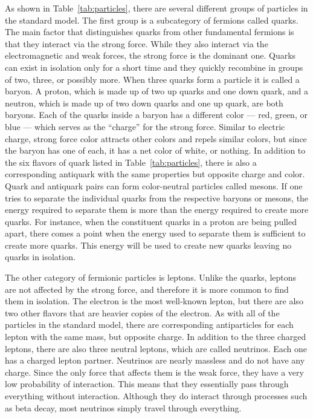 As shown in Table~\ref{tab:particles}, there are several different groups of particles in the standard model. The first group is a subcategory of fermions called quarks. The main factor that distinguishes quarks from other fundamental fermions is that they interact via the strong force. While they also interact via the electromagnetic and weak forces, the strong force is the dominant one. Quarks can exist in isolation only for a short time and they quickly recombine in groups of two, three, or possibly more. When three quarks form a particle it is called a baryon. A proton, which is made up of two up quarks and one down quark, and a neutron, which is made up of two down quarks and one up quark, are both baryons. Each of the quarks inside a baryon has a different color --- red, green, or blue --- which serves as the ``charge'' for the strong force. Similar to electric charge, strong force color attracts other colors and repels similar colors, but since the baryon has one of each, it has a net color of white, or nothing. In addition to the six flavors of quark listed in Table~\ref{tab:particles}, there is also a corresponding antiquark with the same properties but opposite charge and color. Quark and antiquark pairs can form color-neutral particles called mesons. If one tries to separate the individual quarks from the respective baryons or mesons, the energy required to separate them is more than the energy required to create more quarks. For instance, when the constituent quarks in a proton are being pulled apart, there comes a point when the energy used to separate them is sufficient to create more quarks. This energy will be used to create new quarks leaving no quarks in isolation.

The other category of fermionic particles is leptons. Unlike the quarks, leptons are not affected by the strong force, and therefore it is more common to find them in isolation. The electron is the most well-known lepton, but there are also two other flavors that are heavier copies of the electron. As with all of the particles in the standard model, there are corresponding antiparticles for each lepton with the same mass, but opposite charge. In addition to the three charged leptons, there are also three neutral leptons, which are called neutrinos. Each one has a charged lepton partner. Neutrinos are nearly massless and do not have any charge. Since the only force that affects them is the weak force, they have a very low probability of interaction. This means that they essentially pass through everything without interaction. Although they do interact through processes such as beta decay, most neutrinos simply travel through everything. 

